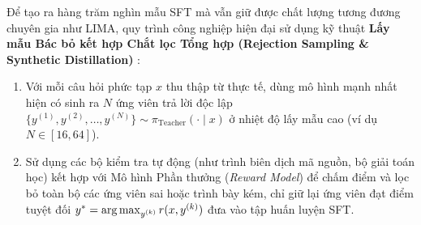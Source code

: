 Để tạo ra hàng trăm nghìn mẫu SFT mà vẫn giữ được chất lượng tương đương chuyên gia như LIMA, quy trình công nghiệp hiện đại sử dụng kỹ thuật \textbf{Lấy mẫu Bác bỏ kết hợp Chắt lọc Tổng hợp (Rejection Sampling \& Synthetic Distillation)} \citep{dubey2024llama}:
\begin{enumerate}[leftmargin=1.2cm]
    \item Với mỗi câu hỏi phức tạp $x$ thu thập từ thực tế, dùng mô hình mạnh nhất hiện có sinh ra $N$ ứng viên trả lời độc lập $\{y^{(1)}, y^{(2)}, \dots, y^{(N)}\} \sim \pi_{\text{Teacher}}(\cdot \mid x)$ ở nhiệt độ lấy mẫu cao (ví dụ $N \in [16, 64]$).
    \item Sử dụng các bộ kiểm tra tự động (như trình biên dịch mã nguồn, bộ giải toán học) kết hợp với Mô hình Phần thưởng (\textit{Reward Model}) để chấm điểm và lọc bỏ toàn bộ các ứng viên sai hoặc trình bày kém, chỉ giữ lại ứng viên đạt điểm tuyệt đối $y^* = \operatorname*{arg\,max}_{y^{(k)}} r(x, y^{(k)})$ đưa vào tập huấn luyện SFT.
\end{enumerate}
